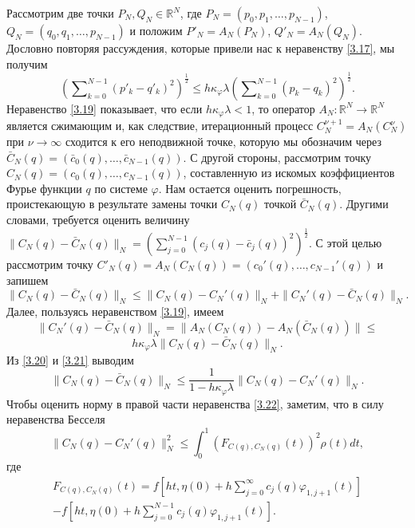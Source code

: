  Рассмотрим две точки $P_N,Q_N\in \mathbb{R}^N$, где $P_N=(p_0,p_1,\ldots,p_{N-1})$,\\   $Q_N=(q_0,q_1,\ldots,p_{N-1})$ и положим $P'_N=A_N(P_N)$, $Q'_N=A_N(Q_N)$. Дословно повторяя рассуждения, которые привели нас к неравенству \eqref{3.17}, мы получим
\begin{equation}\label{3.19}
\left(\sum\nolimits_{k=0}^{N-1} (p'_k-q'_k)^2\right)^\frac12\le h\kappa_\varphi\lambda \left(\sum\nolimits_{k=0}^{N-1} (p_k-q_k)^2\right)^\frac12.
\end{equation}
Неравенство \eqref{3.19} показывает, что если $h\kappa_\varphi\lambda<1$, то оператор  $A_N:\mathbb{R}^N\to \mathbb{R}^N$ является сжимающим и, как следствие, итерационный процесс $C_N^{\nu+1}=A_N(C_N^{\nu})$  при $\nu\to\infty$ сходится к его неподвижной точке, которую мы обозначим через  $\bar C_N(q)=(\bar c_0(q),\ldots,\bar c_{N-1}(q))$. С другой стороны, рассмотрим точку $C_N(q)=(c_0(q),\ldots,c_{N-1}(q))$, составленную из искомых коэффициентов Фурье функции $q$ по системе $\varphi$. Нам остается оценить погрешность, проистекающую в результате замены точки $C_N(q)$ точкой $\bar C_N(q)$. Другими словами, требуется оценить величину
$\|C_N(q)-\bar C_N(q)\|_N= \left(\sum_{j=0}^{N-1}(c_j(q)-\bar c_j(q))^2\right)^\frac12$. С этой целью рассмотрим точку $C'_N(q)=A_N(C_N(q))=(c_0'(q),\ldots,c_{N-1}'(q))$ и запишем
\begin{equation}\label{3.20}
\|C_N(q)-\bar C_N(q)\|_N\le \|C_N(q)- C_N'(q)\|_N+\|C_N'(q)-\bar C_N(q)\|_N.
\end{equation}
Далее, пользуясь неравенством \eqref{3.19}, имеем
$$
\|C_N'(q)-\bar C_N(q)\|_N=\|A_N(C_N(q))-A_N(\bar C_N(q))\|\le
$$
\begin{equation}\label{3.21}
h\kappa_\varphi\lambda\|C_N(q)-\bar C_N(q)\|_N.
\end{equation}
Из \eqref{3.20} и \eqref{3.21} выводим
\begin{equation}\label{3.22}
\|C_N(q)-\bar C_N(q)\|_N\le \frac1{1-h\kappa_\varphi\lambda}\|C_N(q)- C_N'(q)\|_N.
\end{equation}
Чтобы оценить норму в правой части неравенства \eqref{3.22}, заметим, что в силу неравенства Бесселя
\begin{equation}\label{3.23}
\|C_N(q)- C_N'(q)\|_N^2\le \int_{0}^1(F_{C(q),C_N(q)}(t))^2\rho(t) dt,
\end{equation}
где
\begin{multline}\label{3.24}
 F_{C(q),C_N(q)}(t)=f\left[ht,\eta(0)+ h\sum\nolimits_{j=0}^\infty c_j(q)\varphi_{1,j+1}(t)\right] \\
  -f\left[ht,\eta(0)+ h\sum\nolimits_{j=0}^{N-1}c_j(q)\varphi_{1,j+1}(t)\right].
\end{multline}
